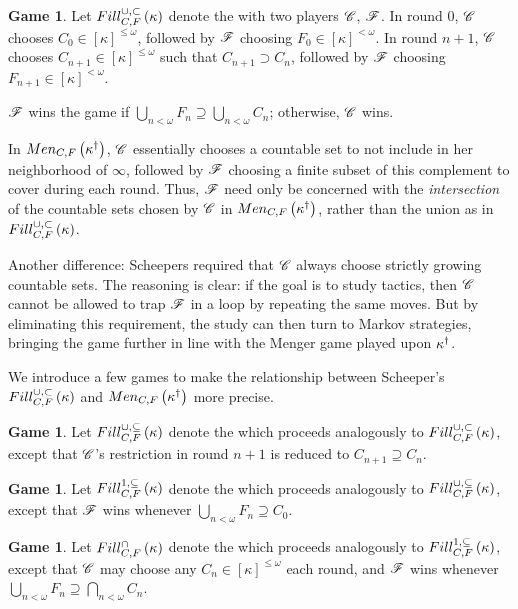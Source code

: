 \documentclass{amsart}
\theoremstyle{definition}
\newtheorem{game}[theorem]{Game}
\begin{document}
\begin{game}
  Let \(Fill^{\cup,\subset}_{C,F}\left({\kappa}\right)\) denote the 
  with two players \(\mathscr{C}\), \(\mathscr{F}\). In round \(0\), \(\mathscr{C}\) chooses
  \(C_0\in[\kappa]^{\leq\omega}\), followed by \(\mathscr{F}\) choosing
  \(F_0\in[\kappa]^{<\omega}\). In round \(n+1\), \(\mathscr{C}\) chooses
  \(C_{n+1}\in[\kappa]^{\leq\omega}\) such that \(C_{n+1}\supset C_n\), followed
  by \(\mathscr{F}\) choosing \(F_{n+1}\in[\kappa]^{<\omega}\).

  \(\mathscr{F}\) wins the game if
  \(\bigcup_{n<\omega} F_n\supseteq\bigcup_{n<\omega} C_n\); otherwise, \(\mathscr{C}\)
  wins.
\end{game}

In \(Men_{C,F}\left({\kappa^\dagger}\right)\), \(\mathscr{C}\) essentially chooses a countable set
to not include in her neighborhood of \(\infty\), followed by \(\mathscr{F}\) choosing
a finite subset of this complement to cover during each round. Thus,
\(\mathscr{F}\) need only be concerned with the \textit{intersection} of the
countable sets chosen by \(\mathscr{C}\) in \(Men_{C,F}\left({\kappa^\dagger}\right)\), rather
than the union as in \(Fill^{\cup,\subset}_{C,F}\left({\kappa}\right)\).

Another difference: Scheepers required that \(\mathscr{C}\) always choose strictly
growing countable sets. The reasoning is clear: if the goal is to study tactics,
then \(\mathscr{C}\) cannot be allowed to trap \(\mathscr{F}\) in a loop by repeating the same
moves. But by eliminating this requirement, the study can then turn to Markov
strategies, bringing the game further in line with the Menger game played upon
\(\kappa^\dagger\).

We introduce a few games to make the relationship between Scheeper's
\(Fill^{\cup,\subset}_{C,F}\left({\kappa}\right)\) and \(Men_{C,F}\left({\kappa^\dagger}\right)\) more precise.

\begin{game}
  Let \(Fill^{\cup,\subseteq}_{C,F}\left({\kappa}\right)\) denote the
   which proceeds analogously
  to \(Fill^{\cup,\subset}_{C,F}\left({\kappa}\right)\), except that \(\mathscr{C}\)'s restriction in round \(n+1\)
  is reduced to \(C_{n+1}\supseteq C_n\).
\end{game}

\begin{game}
  Let \(Fill^{1,\subseteq}_{C,F}\left({\kappa}\right)\) denote the
   which proceeds analogously
  to \(Fill^{\cup,\subseteq}_{C,F}\left({\kappa}\right)\), except that \(\mathscr{F}\) wins whenever
  \(\bigcup_{n<\omega}F_n\supseteq C_0\).
\end{game}

\begin{game}
  Let \(Fill^{\cap}_{C,F}\left({\kappa}\right)\) denote the
   which proceeds analogously
  to \(Fill^{1,\subseteq}_{C,F}\left({\kappa}\right)\), except that \(\mathscr{C}\) may choose any
  \(C_n\in[\kappa]^{\leq\omega}\) each round, and \(\mathscr{F}\) wins whenever
  \(\bigcup_{n<\omega}F_n\supseteq\bigcap_{n<\omega}C_n\).
\end{game}
\end{document}
